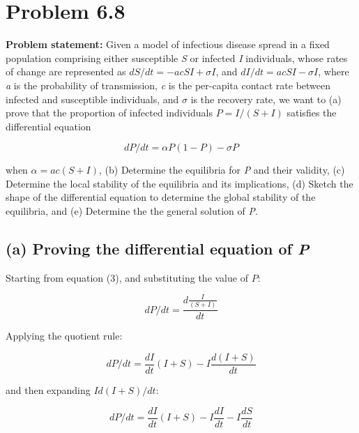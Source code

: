 \hypertarget{problem-6.8}{%
\section{Problem 6.8}\label{problem-6.8}}

\textbf{Problem statement:} Given a model of infectious disease spread
in a fixed population comprising either susceptible \emph{S} or infected
\emph{I} individuals, whose rates of change are represented as
\(dS/dt = -acSI + \sigma I\), and \(dI/dt = acSI - \sigma I\), where
\emph{a} is the probability of transmission, \emph{c} is the per-capita
contact rate between infected and susceptible individuals, and
\(\sigma\) is the recovery rate, we want to (a) prove that the
proportion of infected individuals \(P = I/(S+I)\) satisfies the
differential equation

\begin{equation} dP/dt = \alpha P(1 - P) - \sigma P \end{equation}

when \(\alpha = ac (S+I)\), (b) Determine the equilibria for \emph{P}
and their validity, (c) Determine the local stability of the equilibria
and its implications, (d) Sketch the shape of the differential equation
to determine the global stability of the equilibria, and (e) Determine
the the general solution of \emph{P}.

\hypertarget{a-proving-the-differential-equation-of-p}{%
\subsection{\texorpdfstring{(a) Proving the differential equation of
\emph{P}}{(a) Proving the differential equation of P}}\label{a-proving-the-differential-equation-of-p}}

Starting from equation (3), and substituting the value of \(P\):

\begin{equation} dP/dt = \frac{d\frac{I}{(S+I)}}{dt}  \end{equation}

Applying the quotient rule:

\begin{equation} dP/dt = \frac{dI}{dt} (I+S) - I \frac{d(I+S)}{dt} \end{equation}

and then expanding \(I d(I+S)/dt\):

\begin{equation} dP/dt = \frac{dI}{dt} (I+S) - I \frac{dI}{dt} - I \frac{dS}{dt} \end{equation}

